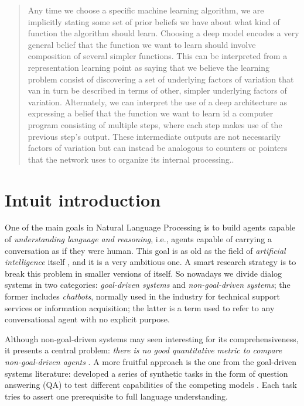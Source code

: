 \begin{quote}
Any time we choose a specific machine learning algorithm, we are implicitly stating some set of prior beliefs we have about what kind of function the algorithm should learn. Choosing a deep model encodes a very general belief that the function we want to learn should involve composition of several simpler functions. This can be interpreted from a representation learning point as saying that we believe the learning problem consist of discovering a set of underlying factors of variation that van in turn be described in terms of other, simpler underlying factors of variation. Alternately, we can interpret  the use of a deep architecture as expressing a belief that the function we want to learn id a computer program consisting of multiple steps, where each step makes use of the previous step's output. These intermediate outputs are not necessarily factors of variation but can instead be analogous to counters or pointers that the network uses to organize its internal processing.\cite[p.~195]{DeepLearningbook}.
\end{quote}


\section{Intuit introduction}


One of the main goals in Natural Language Processing is to build agents capable of \textit{understanding language and reasoning}, i.e., agents capable of carrying a conversation as if they were human. This goal is as old as the field of \textit{artificial intelligence} itself \cite{Turing}, and it is a very ambitious one. A smart research strategy is to break this problem in smaller versions of itself. So nowadays we divide dialog systems in two categories: \textit{goal-driven systems} and \textit{non-goal-driven systems}; the former includes \textit{chatbots}, normally used in the industry for technical support services or information acquisition; the latter is a term used to refer to any conversational agent with no explicit purpose.

Although non-goal-driven systems may seen interesting for its comprehensiveness, it presents a central problem: \textit{there is no good quantitative metric to compare non-goal-driven agents} \cite{LiuLSNCP16, LoweSNCP16}. A more fruitful approach is the one from the goal-driven systems literature: developed a series of synthetic tasks in the form of question answering (QA) to test different capabilities of the competing models \cite{BordesW16, Hixon15, WestonBCM15}. Each task tries to assert one prerequisite to full language understanding.

